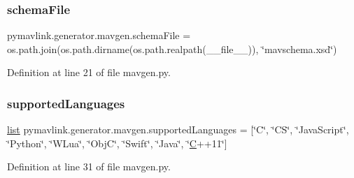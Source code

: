 \subsubsection{\texorpdfstring{schemaFile}{schemaFile}}
{\footnotesize\ttfamily pymavlink.\+generator.\+mavgen.\+schema\+File = os.\+path.\+join(os.\+path.\+dirname(os.\+path.\+realpath(\+\_\+\+\_\+file\+\_\+\+\_\+)), \char`\"{}mavschema.\+xsd\char`\"{})}



Definition at line 21 of file mavgen.\+py.

\mbox{\label{namespacepymavlink_1_1generator_1_1mavgen_aab04d5e3d392e7ed72368d0ee440437a}} 
\subsubsection{\texorpdfstring{supportedLanguages}{supportedLanguages}}
{\footnotesize\ttfamily \mbox{\hyperlink{structlist}{list}} pymavlink.\+generator.\+mavgen.\+supported\+Languages = \mbox{[}\char`\"{}C\char`\"{}, \char`\"{}CS\char`\"{}, \char`\"{}Java\+Script\char`\"{}, \char`\"{}Python\char`\"{}, \char`\"{}W\+Lua\char`\"{}, \char`\"{}ObjC\char`\"{}, \char`\"{}Swift\char`\"{}, \char`\"{}Java\char`\"{}, \char`\"{}\mbox{\hyperlink{mavlink__sha256_8h_ac4cf4b2ab929bd23951a8676eeac086b}{C}}++11\char`\"{}\mbox{]}}



Definition at line 31 of file mavgen.\+py.

